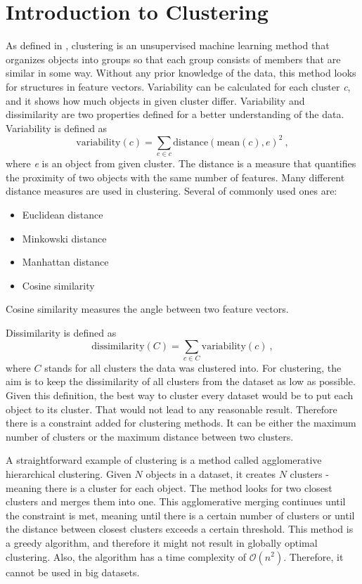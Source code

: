 \documentclass[thesis=B,english]{FITthesis}[2012/10/20]
\begin{document}
\section{Introduction to Clustering}\label{sec:clust_intro}
As defined in \cite{guttag2016introduction}, clustering is an unsupervised machine learning method that organizes objects into groups so that each group consists of members that are similar in some way.
Without any prior knowledge of the data, this method looks for structures in feature vectors.
Variability can be calculated for each cluster \textit{c}, and it shows how much objects in given cluster differ.
Variability and dissimilarity are two properties defined for a better understanding of the data.
Variability is defined as
\begin{equation}
\mathrm{variability}(c) = \sum_{e \in c} \mathrm{distance}(\mathrm{mean}(c), e)^2\:,
\end{equation}
 where \textit{e} is an object from given cluster.
The distance is a measure that quantifies the proximity of two objects with the same number of features.
Many different distance measures are used in clustering.
Several of commonly used ones are:
\begin{itemize}
    \item Euclidean distance
    \item Minkowski distance
    \item Manhattan distance
    \item Cosine similarity
\end{itemize}
Cosine similarity measures the angle between two feature vectors.

Dissimilarity is defined as
\begin{equation}
\mathrm{dissimilarity}(C) = \sum_{c \in C} \mathrm{variability}(c)\:,
\end{equation}
where $C$ stands for all clusters the data was clustered into.
For clustering, the aim is to keep the dissimilarity of all clusters from the dataset as low as possible.
Given this definition, the best way to cluster every dataset would be to put each object to its cluster.
That would not lead to any reasonable result.
Therefore there is a constraint added for clustering methods.
It can be either the maximum number of clusters or the maximum distance between two clusters.

A straightforward example of clustering is a method called agglomerative hierarchical clustering.
Given $N$ objects in a dataset, it creates $N$ clusters - meaning there is a cluster for each object.
The method looks for two closest clusters and merges them into one.
This agglomerative merging continues until the constraint is met, meaning until there is a certain number of clusters or until the distance between closest clusters exceeds a certain threshold.
This method is a greedy algorithm, and therefore it might not result in globally optimal clustering.
Also, the algorithm has a time complexity of $\mathcal{O}(n^2)$.
Therefore, it cannot be used in big datasets.
\end{document}

